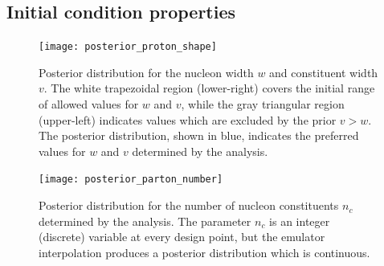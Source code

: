 \documentclass[aps,prc,reprint,amsmath,nofootinbib]{revtex4-1}
\newenvironment{fullpage}{\onecolumngrid}{\clearpage\twocolumngrid}
\begin{document}
\begin{fullpage}
\begin{figure}
\end{figure}
\end{fullpage}

\subsection{Initial condition properties}

\begin{figure}
  \texttt{[image: posterior\_proton\_shape]}
  \caption{\label{fig:posterior_proton_shape}
  Posterior distribution for the nucleon width $w$ and constituent width $v$. The white trapezoidal region (lower-right) covers the initial range of allowed values for $w$ and $v$, while the gray triangular region (upper-left) indicates values which are excluded by the prior $v > w$. The posterior distribution, shown in blue, indicates the preferred values for $w$ and $v$ determined by the analysis.}
\end{figure}

\begin{figure}[b]
  \texttt{[image: posterior\_parton\_number]}
  \caption{\label{fig:posterior_parton_number}
    Posterior distribution for the number of nucleon constituents $n_c$ determined by the analysis.
    The parameter $n_c$ is an integer (discrete) variable at every design point, but the emulator interpolation produces a posterior distribution which is continuous.
  }
\end{figure}
\end{document}
